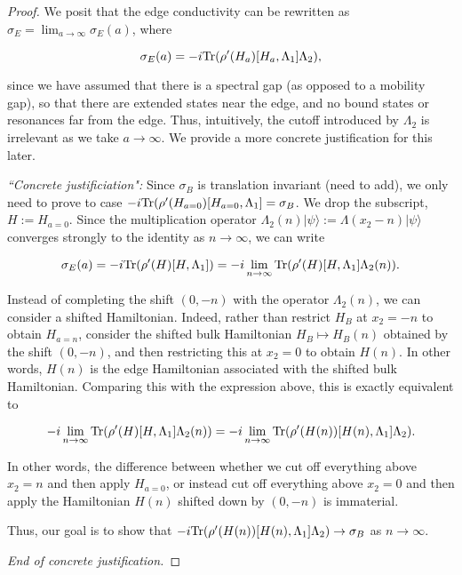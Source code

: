 \documentclass[12pt, letterpaper]{article}
\begin{document}
\begin{proof}

We posit that the edge conductivity can be rewritten as $\sigma_E = \lim_{a\to\infty}\sigma_E(a)$, where

\[\sigma_E(a) = -i\text{Tr}(\rho'(H_a)[H_a,\Lambda_1]\Lambda_2),\]

since we have assumed that there is a spectral gap (as opposed to a mobility gap), so that there are extended states near the edge, and no bound states or resonances far from the edge. Thus, intuitively, the cutoff introduced by $\Lambda_2$ is irrelevant as we take $a\to\infty$. We provide a more concrete justification for this later.


\textit{``Concrete justificiation":}
Since $\sigma_B$ is translation invariant (need to add), we only need to prove to case $-i\text{Tr}(\rho'(H_{a=0})[H_{a=0},\Lambda_1] = \sigma_B$. We drop the subscript, $H := H_{a=0}$. Since the multiplication operator $\Lambda_2(n) |\psi\rangle := \Lambda(x_2-n) |\psi\rangle$ converges strongly to the identity as $n\to\infty$, we can write

\[\sigma_E(a) = -i\text{Tr}(\rho'(H)[H,\Lambda_1]) = -i\lim_{n\to\infty}\text{Tr}(\rho'(H)[H,\Lambda_1]\Lambda_2(n)).\]

Instead of completing the shift $(0,-n)$ with the operator $\Lambda_2(n)$, we can consider a shifted Hamiltonian. Indeed, rather than restrict $H_B$ at $x_2=-n$ to obtain $H_{a=n}$, consider the shifted bulk Hamiltonian $H_B \mapsto H_B(n)$ obtained by the shift $(0,-n)$, and then restricting this at $x_2=0$ to obtain $H(n)$. In other words, $H(n)$ is the edge Hamiltonian associated with the shifted bulk Hamiltonian. Comparing this with the expression above, this is exactly equivalent to 

\[-i\lim_{n\to\infty}\text{Tr}(\rho'(H)[H,\Lambda_1]\Lambda_2(n)) = -i\lim_{n\to\infty}\text{Tr}(\rho'(H(n))[H(n),\Lambda_1]\Lambda_2).\]

In other words, the difference between whether we cut off everything above $x_2=n$ and then apply $H_{a=0}$, or instead cut off everything above $x_2=0$ and then apply the Hamiltonian $H(n)$ shifted down by $(0,-n)$ is immaterial. 

Thus, our goal is to show that $-i\text{Tr}(\rho'(H(n))[H(n),\Lambda_1]\Lambda_2) \to \sigma_B$ as $n\to\infty$. 

\textit{End of concrete justification.}




\end{proof}
\end{document}
